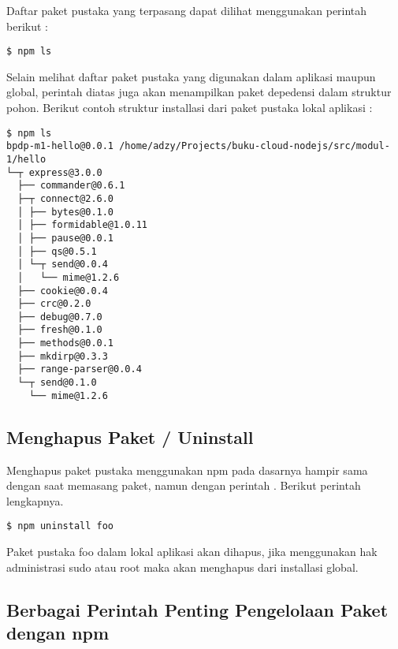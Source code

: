 Daftar paket pustaka yang terpasang dapat dilihat menggunakan perintah berikut :

\lstset{language=bash,caption=Hasil instalasi Flatiron}
\begin{lstlisting}
$ npm ls
\end{lstlisting}

Selain melihat daftar paket pustaka yang digunakan dalam aplikasi maupun global, perintah diatas juga akan menampilkan paket depedensi dalam struktur pohon. Berikut contoh struktur installasi dari paket pustaka lokal aplikasi :

\lstset{language=bash,caption=Hasil instalasi Flatiron}
\begin{lstlisting}
$ npm ls
bpdp-m1-hello@0.0.1 /home/adzy/Projects/buku-cloud-nodejs/src/modul-1/hello
└─┬ express@3.0.0 
  ├── commander@0.6.1 
  ├─┬ connect@2.6.0 
  │ ├── bytes@0.1.0 
  │ ├── formidable@1.0.11 
  │ ├── pause@0.0.1 
  │ ├── qs@0.5.1 
  │ └─┬ send@0.0.4 
  │   └── mime@1.2.6 
  ├── cookie@0.0.4 
  ├── crc@0.2.0 
  ├── debug@0.7.0 
  ├── fresh@0.1.0 
  ├── methods@0.0.1 
  ├── mkdirp@0.3.3 
  ├── range-parser@0.0.4 
  └─┬ send@0.1.0 
    └── mime@1.2.6 
\end{lstlisting}

\subsection{Menghapus Paket / Uninstall}

Menghapus paket pustaka menggunakan npm pada dasarnya hampir sama dengan saat memasang paket, namun dengan perintah . Berikut perintah lengkapnya.

\lstset{language=bash,caption=Hasil instalasi Flatiron}
\begin{lstlisting}
$ npm uninstall foo
\end{lstlisting}

Paket pustaka foo dalam lokal aplikasi akan dihapus, jika menggunakan hak administrasi sudo atau root maka akan menghapus dari installasi global.

\subsection{Berbagai Perintah Penting Pengelolaan Paket dengan npm}

